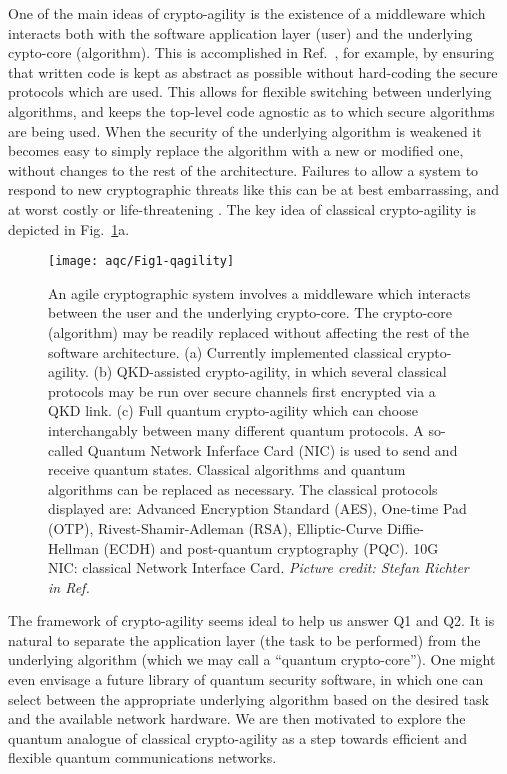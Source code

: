 One of the main ideas of crypto-agility is the existence of a middleware which interacts both with the software application layer (user) and the underlying cypto-core (algorithm). This is accomplished in Ref.~\cite{Sullivan2009}, for example, by ensuring that written code is kept as abstract as possible without hard-coding the secure protocols which are used. This allows for flexible switching between underlying algorithms, and keeps the top-level code agnostic as to which secure algorithms are being used. When the security of the underlying algorithm is weakened it becomes easy to simply replace the algorithm with a new or modified one, without changes to the rest of the architecture. Failures to allow a system to respond to new cryptographic threats like this can be at best embarrassing, and at worst costly or life-threatening \cite{Schneier2016, Schneier2017}. The key idea of classical crypto-agility is depicted in Fig.~\ref{fig:agility}a. 


\begin{figure}[htp]
\captionsetup{width=0.8\linewidth}
\centering
\texttt{[image: aqc/Fig1-qagility]}
\caption{\label{fig:agility} An agile cryptographic system involves a middleware which interacts between the user and the underlying crypto-core. The crypto-core (algorithm) may be readily replaced without affecting the rest of the software architecture. (a) Currently implemented classical crypto-agility. (b) QKD-assisted crypto-agility, in which several classical protocols may be run over secure channels first encrypted via a QKD link. (c) Full quantum crypto-agility which can choose interchangably between many different quantum protocols. A so-called Quantum Network Inferface Card (NIC) is used to send and receive quantum states. Classical algorithms and quantum algorithms can be replaced as necessary. The classical protocols displayed are: Advanced Encryption Standard (AES), One-time Pad (OTP), Rivest-Shamir-Adleman (RSA), Elliptic-Curve Diffie-Hellman (ECDH) and post-quantum cryptography (PQC). 10G NIC: classical Network Interface Card. \emph{Picture credit: Stefan Richter in Ref.~\cite{Richter2020}}}
\end{figure}


The framework of crypto-agility seems ideal to help us answer Q1 and Q2. It is natural to separate the application layer (the task to be performed) from the underlying algorithm (which we may call a ``quantum crypto-core''). One might even envisage a future library of quantum security software, in which one can select between the appropriate underlying algorithm based on the desired task and the available network hardware. We are then motivated to explore the quantum analogue of classical crypto-agility as a step towards efficient and flexible quantum communications networks.



